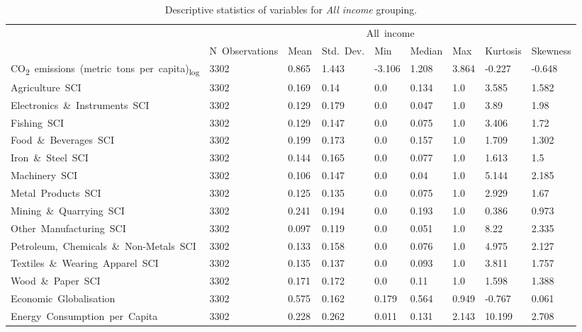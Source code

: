 \documentclass[10pt]{article}
\begin{document}
\begin{table}
	\centering
	\caption{Descriptive statistics of variables for \textit{All income} grouping.}
      \label{tab:descriptive-all}
      \begin{adjustbox}{width=\textwidth,center}
      \begin{tabular}{lllllllll}
      \toprule
       & \multicolumn{8}{c}{All\ income} \\
       & N\ Observations & Mean & Std.\ Dev. & Min & Median & Max & Kurtosis & Skewness \\
      \midrule
      CO\textsubscript{2}\ emissions\ (metric\ tons\ per\ capita)\textsubscript{log} & 3302 & 0.865 & 1.443 & -3.106 & 1.208 & 3.864 & -0.227 & -0.648 \\
      Agriculture\ SCI & 3302 & 0.169 & 0.14 & 0.0 & 0.134 & 1.0 & 3.585 & 1.582 \\
      Electronics\ \&\ Instruments\ SCI & 3302 & 0.129 & 0.179 & 0.0 & 0.047 & 1.0 & 3.89 & 1.98 \\
      Fishing\ SCI & 3302 & 0.129 & 0.147 & 0.0 & 0.075 & 1.0 & 3.406 & 1.72 \\
      Food\ \&\ Beverages\ SCI & 3302 & 0.199 & 0.173 & 0.0 & 0.157 & 1.0 & 1.709 & 1.302 \\
      Iron\ \&\ Steel\ SCI & 3302 & 0.144 & 0.165 & 0.0 & 0.077 & 1.0 & 1.613 & 1.5 \\
      Machinery\ SCI & 3302 & 0.106 & 0.147 & 0.0 & 0.04 & 1.0 & 5.144 & 2.185 \\
      Metal\ Products\ SCI & 3302 & 0.125 & 0.135 & 0.0 & 0.075 & 1.0 & 2.929 & 1.67 \\
      Mining\ \&\ Quarrying\ SCI & 3302 & 0.241 & 0.194 & 0.0 & 0.193 & 1.0 & 0.386 & 0.973 \\
      Other\ Manufacturing\ SCI & 3302 & 0.097 & 0.119 & 0.0 & 0.051 & 1.0 & 8.22 & 2.335 \\
      Petroleum,\ Chemicals\ \&\ Non-Metals\ SCI & 3302 & 0.133 & 0.158 & 0.0 & 0.076 & 1.0 & 4.975 & 2.127 \\
      Textiles\ \&\ Wearing\ Apparel\ SCI & 3302 & 0.135 & 0.137 & 0.0 & 0.093 & 1.0 & 3.811 & 1.757 \\
      Wood\ \&\ Paper\ SCI & 3302 & 0.171 & 0.172 & 0.0 & 0.11 & 1.0 & 1.598 & 1.388 \\
      Economic\ Globalisation & 3302 & 0.575 & 0.162 & 0.179 & 0.564 & 0.949 & -0.767 & 0.061 \\
      Energy\ Consumption\ per\ Capita & 3302 & 0.228 & 0.262 & 0.011 & 0.131 & 2.143 & 10.199 & 2.708 \\

\end{tabular}
\end{adjustbox}
\end{table}
\end{document}
